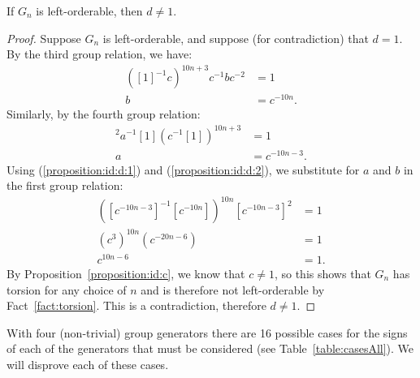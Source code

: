 \begin{proposition}
If $G_n$ is left-orderable, then $d\neq1$.
\label{proposition:id:d}
\end{proposition}
\begin{proof} Suppose $G_n$ is left-orderable, and suppose (for contradiction) that $d=1$. By the third group relation, we have:
\begin{align}
([1]^{-1}c)^{10n+3}c^{-1}bc^{-2} & =1\nonumber\\
b & =c^{-10n}.\label{proposition:id:d:1}
\end{align}
Similarly, by the fourth group relation:
\begin{align}
[1]^{2}a^{-1}[1](c^{-1}[1])^{10n+3} & =1\nonumber\\
a & =c^{-10n-3}.\label{proposition:id:d:2}
\end{align}
Using (\ref{proposition:id:d:1}) and (\ref{proposition:id:d:2}), we substitute for $a$ and $b$ in the first group relation:
\begin{align}
([c^{-10n-3}]^{-1}[c^{-10n}])^{10n}[c^{-10n-3}]^{2} & =1\nonumber\\
(c^{3})^{10n}(c^{-20n-6}) & =1\nonumber\\
c^{10n-6} & =1.\nonumber
\end{align}
By Proposition~\ref{proposition:id:c}, we know that $c\neq1$, so this shows that $G_{n}$ has torsion for any choice of $n$ and is therefore not left-orderable by Fact~\ref{fact:torsion}. This is a contradiction, therefore $d\neq{}1$.
\end{proof}

\noindent{}With four (non-trivial) group generators there are 16 possible cases for the signs of each of the generators that must be considered (see Table~\ref{table:casesAll}). We will disprove each of these cases.



